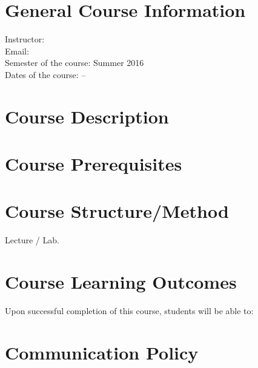 \documentclass[12pt]{article}
\title{\BLOCK{block title}\BLOCK{endblock}}
\author{\vspace{-5ex}}
\date{\vspace{-5ex}}
\begin{document}
\maketitle

\section*{General Course Information}

Instructor:  \\
Email:  \\
Semester of the course: Summer 2016 \\
Dates of the course:  -- 

\section*{Course Description}

\section*{Course Prerequisites}

\section*{Course Structure/Method}
Lecture / Lab. 

\section*{Course Learning Outcomes}

Upon successful completion of this course, students will be able to:
\begin{enumerate}
\end{enumerate}

\section*{Communication Policy}
\end{document}
